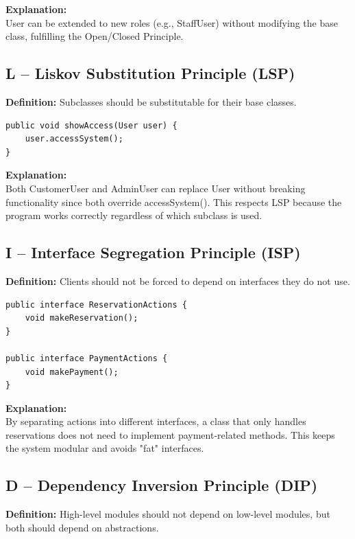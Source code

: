 \documentclass[12pt, letterpaper]{article}
\begin{document}
\textbf{Explanation:}\\
User can be extended to new roles (e.g., StaffUser) without modifying the base class, fulfilling the Open/Closed Principle.

\subsection{L -- Liskov Substitution Principle (LSP)}

\textbf{Definition:} Subclasses should be substitutable for their base classes.

\begin{lstlisting}[caption=LSP Implementation Example]
public void showAccess(User user) {
    user.accessSystem();
}
\end{lstlisting}

\textbf{Explanation:}\\
Both CustomerUser and AdminUser can replace User without breaking functionality since both override accessSystem(). This respects LSP because the program works correctly regardless of which subclass is used.

\subsection{I -- Interface Segregation Principle (ISP)}

\textbf{Definition:} Clients should not be forced to depend on interfaces they do not use.

\begin{lstlisting}[caption=ISP Implementation Example]
public interface ReservationActions {
    void makeReservation();
}

public interface PaymentActions {
    void makePayment();
}
\end{lstlisting}

\textbf{Explanation:}\\
By separating actions into different interfaces, a class that only handles reservations does not need to implement payment-related methods. This keeps the system modular and avoids "fat" interfaces.

\subsection{D -- Dependency Inversion Principle (DIP)}

\textbf{Definition:} High-level modules should not depend on low-level modules, but both should depend on abstractions.
\end{document}
